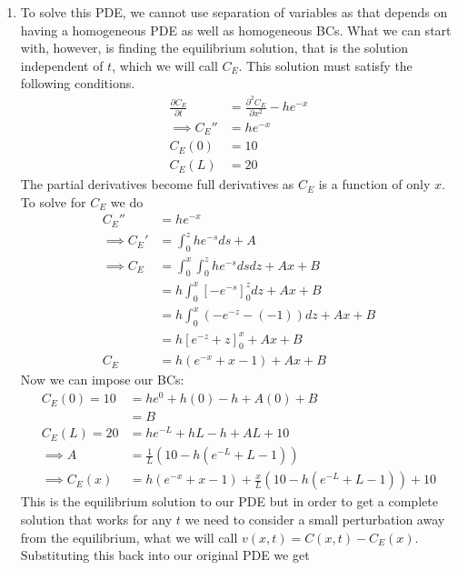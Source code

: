 \documentclass[12pt]{article}
\begin{document}
\begin{enumerate}
        \begin{enumerate}
            \item To solve this PDE, we cannot use separation of variables as that depends on having 
            a homogeneous PDE as well as homogeneous BCs. What we can start with, however, is finding 
            the equilibrium solution, that is the solution independent of $t$, which we will call $C_E$.
            This solution must satisfy the following conditions.
            \begin{align*}
                \frac{\partial C_E}{\partial t}&=\frac{\partial^2 C_E}{\partial x^2}-he^{-x}\\
                \implies C_E''&=he^{-x}\\
                C_E(0)&=10\\
                C_E(L)&=20
            \end{align*}
            The partial derivatives become full derivatives as $C_E$ is a function of only $x$.
            To solve for $C_E$ we do 
            \begin{align*}
                C_E''&=he^{-x}\\
                \implies C_E'&=\int_0^z he^{-s} ds +A\\
                \implies C_E&=\int_0^x \int_0^z he^{-s} ds dz +Ax+B\\
                &=h\int_0^x [-e^{-s}]_0^z dz+ Ax+B\\
                &=h\int_0^x (-e^{-z}-(-1))dz+Ax+B\\
                &=h[e^{-z}+z]_0^x +Ax+B\\
                C_E&=h(e^{-x}+x-1)+Ax+B
            \end{align*}
            Now we can impose our BCs:
            \begin{align*}
                C_E(0)=10&=he^0+h(0)-h+A(0)+B\\
                &=B\\
                C_E(L)=20&=he^{-L}+hL-h+AL+10\\
                \implies A&=\frac{1}{L}(10-h(e^{-L}+L-1))\\
                \implies C_E(x)&=h(e^{-x}+x-1)+\frac{x}{L}(10-h(e^{-L}+L-1))+10
            \end{align*}
            This is the equilibrium solution to our PDE but in order to get a complete solution that 
            works for any $t$ we need to consider a small perturbation away from the equilibrium, what 
            we will call $v(x,t)=C(x,t)-C_E(x)$. Substituting this back into our original PDE we get 

\end{enumerate}
\end{enumerate}
\end{document}
